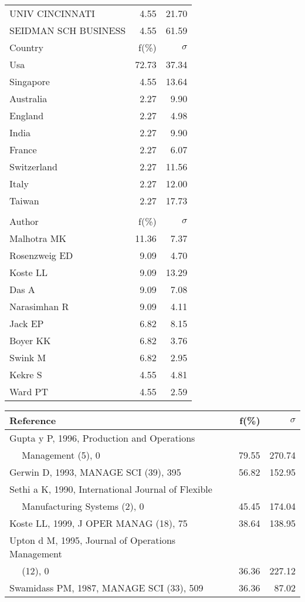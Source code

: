 \documentclass[a4paper,11pt]{report}
\begin{document}
\begin{landscape}
\begin{table}[!ht]
{\begin{tabular}{|l r r|}
UNIV CINCINNATI & 4.55 & 21.70\\
SEIDMAN SCH BUSINESS & 4.55 & 61.59\\
\hline
\hline
Country & f(\%) & $\sigma$\\
\hline
Usa & 72.73 & 37.34\\
Singapore & 4.55 & 13.64\\
Australia & 2.27 & 9.90\\
England & 2.27 & 4.98\\
India & 2.27 & 9.90\\
France & 2.27 & 6.07\\
Switzerland & 2.27 & 11.56\\
Italy & 2.27 & 12.00\\
Taiwan & 2.27 & 17.73\\
 &  & \\
\hline
\hline
Author & f(\%) & $\sigma$\\
\hline
Malhotra MK & 11.36 & 7.37\\
Rosenzweig ED & 9.09 & 4.70\\
Koste LL & 9.09 & 13.29\\
Das A & 9.09 & 7.08\\
Narasimhan R & 9.09 & 4.11\\
Jack EP & 6.82 & 8.15\\
Boyer KK & 6.82 & 3.76\\
Swink M & 6.82 & 2.95\\
Kekre S & 4.55 & 4.81\\
Ward PT & 4.55 & 2.59\\
\hline
\end{tabular}
}
{\scriptsize\begin{tabular}{|l r r|}
\hline
Reference & f(\%) & $\sigma$\\
\hline
Gupta y P, 1996, Production and Operations &  & \\
$\quad$ Management (5), 0 & 79.55 & 270.74\\
Gerwin D, 1993, MANAGE SCI (39), 395 & 56.82 & 152.95\\
Sethi a K, 1990, International Journal of Flexible &  & \\
$\quad$ Manufacturing Systems (2), 0 & 45.45 & 174.04\\
Koste LL, 1999, J OPER MANAG (18), 75 & 38.64 & 138.95\\
Upton d M, 1995, Journal of Operations Management &  & \\
$\quad$ (12), 0 & 36.36 & 227.12\\
Swamidass PM, 1987, MANAGE SCI (33), 509 & 36.36 & 87.02\\

\end{tabular}}
\end{table}
\end{landscape}
\end{document}
